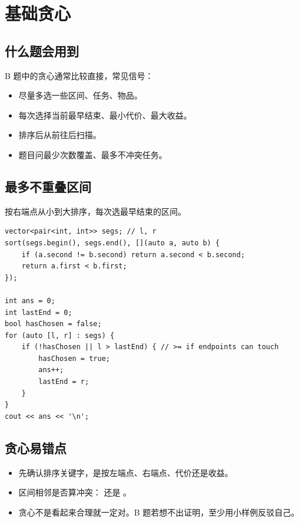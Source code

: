 
\section{基础贪心}\label{sec:06-14}

\subsection{什么题会用到}

B 题中的贪心通常比较直接，常见信号：

\begin{itemize}
  \item 尽量多选一些区间、任务、物品。
  \item 每次选择当前最早结束、最小代价、最大收益。
  \item 排序后从前往后扫描。
  \item 题目问最少次数覆盖、最多不冲突任务。
\end{itemize}

\subsection{最多不重叠区间}

按右端点从小到大排序，每次选最早结束的区间。

\begin{lstlisting}
vector<pair<int, int>> segs; // l, r
sort(segs.begin(), segs.end(), [](auto a, auto b) {
    if (a.second != b.second) return a.second < b.second;
    return a.first < b.first;
});

int ans = 0;
int lastEnd = 0;
bool hasChosen = false;
for (auto [l, r] : segs) {
    if (!hasChosen || l > lastEnd) { // >= if endpoints can touch
        hasChosen = true;
        ans++;
        lastEnd = r;
    }
}
cout << ans << '\n';
\end{lstlisting}

\subsection{贪心易错点}

\begin{itemize}
  \item 先确认排序关键字，是按左端点、右端点、代价还是收益。
  \item 区间相邻是否算冲突： 还是 。
  \item 贪心不是看起来合理就一定对。B 题若想不出证明，至少用小样例反驳自己。
\end{itemize}

